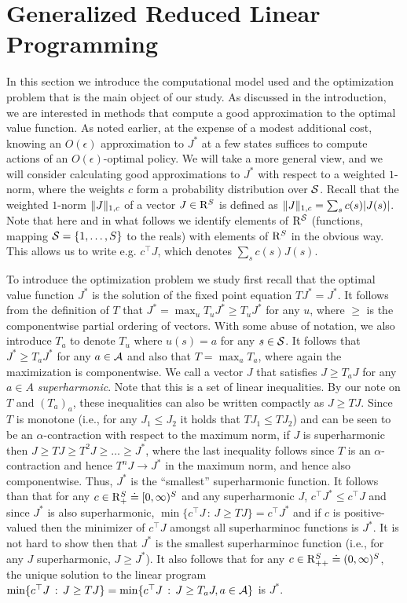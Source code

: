 \section{Generalized Reduced Linear Programming}\label{sec:grlp}
In this section we introduce the computational model used and the optimization problem
that is the main object of our study.
As discussed in the introduction, we are interested in methods that compute a good approximation to the optimal value function.
As noted earlier, at the expense of a modest additional cost, knowing an $O(\epsilon)$ approximation to $J^*$ at a few states suffices to compute actions of an $O(\epsilon)$-optimal policy. We will take a more general view, and we will consider calculating good approximations to $J^*$ with respect to a weighted $1$-norm, where the weights $c$ form a probability distribution over $\S$. Recall that the weighted $1$-norm $\norm{J}_{1,c}$ of a vector $J\in \R^S$ is defined as $\norm{J}_{1,c}  = \sum_s c(s) |J(s)|$. Note that here and in what follows we identify elements of $\R^\S$ (functions, mapping $\S = \{1,\dots,S\}$ to the reals) with elements of $\R^S$ in the obvious way. This allows us to write e.g. $c^\top J$, which denotes $\sum_s c(s) J(s)$.

To introduce the optimization problem we study first recall that 
the optimal value function $J^*$ is the solution of the fixed point equation $TJ^* = J^*$. 
It follows from the definition of $T$ that $J^* = \max_u T_u J^* \ge T_u J^*$ for any $u$, 
where $\ge$ is the componentwise partial ordering of vectors. 
With some abuse of notation, we also introduce $T_a$ to denote $T_u$ where $u(s) = a$ for any $s\in \S$. 
It follows that $J^* \ge T_a J^*$ for any $a\in \A$ and also that $T = \max_a T_a$, where again the maximization is componentwise.
We call a vector $J$ that satisfies $J \ge T_a J$ for any $a\in A$ \emph{superharmonic}. Note that this is a set of linear inequalities. 
By our note on $T$ and $(T_a)_a$, these inequalities can also be written compactly as $J \ge T J$.
Since $T$ is monotone (i.e., for any $J_1\le J_2$ it holds that $TJ_1 \le T J_2$) and can be seen to be an $\alpha$-contraction with respect to the maximum norm, if $J$ is superharmonic then $J \ge T J \ge T^2 J \ge \dots \ge J^*$, where the last inequality follows since $T$ is an $\alpha$-contraction and hence $T^n J \to J^*$ in the maximum norm, and hence also componentwise.
Thus, $J^*$ is the ``smallest'' superharmonic function. It follows than that 
for any $c\in \R_+^S \doteq [0,\infty)^S$ and any superharmonic $J$, $c^\top J^*\le c^\top J$ and since $J^*$ is also superharmonic, $\min \{ c^\top J\,:\, J \ge T J \} = c^\top J^*$ and if $c$ is positive-valued then the minimizer of $c^\top J$ amongst all superharminoc functions is $J^*$.
\fi
It is not hard to show then that $J^*$ is the smallest superharminoc function (i.e., for any $J$ superharmonic, $J\ge J^*$). It also follows that for any  $c\in \R_{++}^S \doteq (0,\infty)^S$, the unique solution to the linear program $\min\{ c^\top J \,:\, J \ge T J \} =\min \{ c^\top J\,:\, J \ge T_a J, a\in \A \} $ is $J^*$. 

